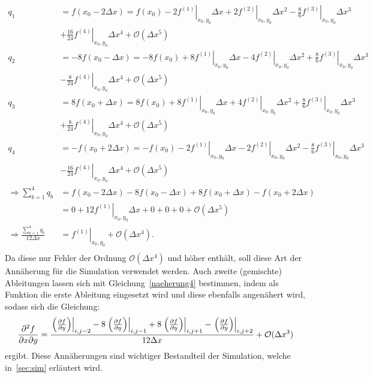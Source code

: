 \begin{align*}
    q_1 &= f(x_0 -2\Delta x) = f(x_0) -2\left.f^{(1)}\right\vert_{x_0,y_0} \Delta x + 2 \left.f^{(2)}\right\vert_{x_0,y_0} \Delta x^2 - \frac{8}{6} \left.f^{(3)}\right\vert_{x_0,y_0} \Delta x^3 \\
    &+ \frac{16}{24}\left.f^{(4)}\right\vert_{x_0,y_0} \Delta x^4 + \mathcal{O}(\Delta x ^5) \\
    q_2 &= -8f(x_0 -\Delta x) = -8f(x_0)+8\left.f^{(1)}\right\vert_{x_0,y_0} \Delta x -4 \left.f^{(2)}\right\vert_{x_0,y_0} \Delta x^2 + \frac{8}{6} \left.f^{(3)}\right\vert_{x_0,y_0} \Delta x^3 \\
    &- \frac{8}{24}\left.f^{(4)}\right\vert_{x_0,y_0} \Delta x ^4+ \mathcal{O}(\Delta x ^5) \\
    q_3 &= 8f(x_0 +\Delta x) = 8f(x_0) +8\left.f^{(1)}\right\vert_{x_0,y_0} \Delta x +4 \left.f^{(2)}\right\vert_{x_0,y_0} \Delta x^2 + \frac{8}{6} \left.f^{(3)}\right\vert_{x_0,y_0} \Delta x^3 \\
    &+ \frac{8}{24}\left.f^{(4)}\right\vert_{x_0,y_0} \Delta x ^4+ \mathcal{O}(\Delta x ^5) \\
    q_4 &= -f(x_0 +2\Delta x) = -f(x_0) -2\left.f^{(1)}\right\vert_{x_0,y_0} \Delta x -2 \left.f^{(2)}\right\vert_{x_0,y_0} \Delta x^2 - \frac{8}{6} \left.f^{(3)}\right\vert_{x_0,y_0} \Delta x^3 \\
    &- \frac{16}{24}\left.f^{(4)}\right\vert_{x_0,y_0} \Delta x^4 + \mathcal{O}(\Delta x ^5) \\
    \Rightarrow \sum_{b=1}^{4} q_b &= f(x_0-2\Delta x) - 8f(x_0 - \Delta x) + 8f(x_0 + \Delta x) - f(x_0 + 2\Delta x) \\
    &= 0 + 12 \left.f^{(1)}\right\vert_{x_0 , y_0} \Delta x + 0 + 0 + 0 + \mathcal{O}(\Delta x^5) \\
    \Rightarrow \frac{\sum_{b=1}^{4} q_b}{12\Delta x} &= \left.f^{(1)}\right\vert_{x_0 , y_0} + \mathcal{O}(\Delta x^4). \\
\end{align*}
Da diese nur Fehler der Ordnung $\mathcal{O}(\Delta x^4)$ und höher enthält, soll diese Art der Annäherung für die Simulation verwendet werden.
Auch zweite (gemischte) Ableitungen lassen sich mit Gleichung~\ref{naeherung4} bestimmen, indem als Funktion die erste Ableitung eingesetzt wird und diese ebenfalls angenähert wird, sodass sich die Gleichung:
\begin{align*}
    \frac{\partial^2 f}{\partial x \partial y} &= \frac{\left.\left( \frac{\partial f}{\partial y}\right)\right\lvert_{i,j-2} - 8\left.\left( \frac{\partial f}{\partial y}\right)\right\lvert_{i,j-1}+8\left.\left( \frac{\partial f}{\partial y}\right)\right\lvert_{i,j+1}-\left.\left( \frac{\partial f}{\partial y}\right)\right\lvert_{i,j+2}}{12\Delta x} + \mathcal{O}(\Delta x^3) \\
\end{align*}
ergibt.
Diese Annäherungen sind wichtiger Bestandteil der Simulation, welche in~\autoref{sec:sim} erläutert wird. 

